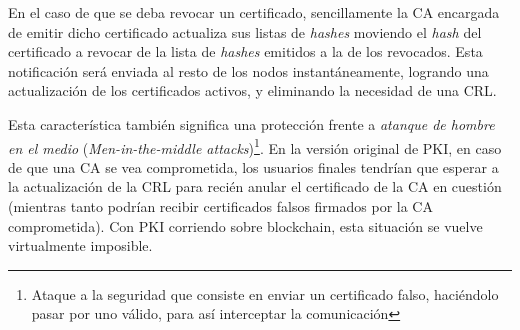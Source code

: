 En el caso de que se deba revocar un certificado, sencillamente la CA encargada de emitir dicho certificado actualiza sus listas de \emph{hashes} moviendo el \emph{hash} del certificado a revocar de la lista de \emph{hashes} emitidos a la de los revocados. Esta notificación será enviada al resto de los nodos instantáneamente, logrando una actualización de los certificados activos, y eliminando la necesidad de una CRL. 

Esta característica también significa una protección frente a \emph{atanque de hombre en el medio} (\emph{Men-in-the-middle attacks})\footnote{Ataque a la seguridad que consiste en enviar un certificado falso, haciéndolo pasar por uno válido, para así interceptar la comunicación}. En la versión original de PKI, en caso de que una CA se vea comprometida, los usuarios finales tendrían que esperar a la actualización de la CRL para recién anular el certificado de la CA en cuestión (mientras tanto podrían recibir certificados falsos firmados por la CA comprometida). Con PKI corriendo sobre blockchain, esta situación se vuelve virtualmente imposible. 

\clearpage
\printbibliography


